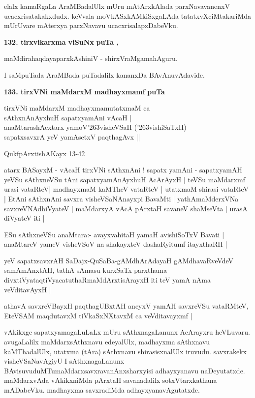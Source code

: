 \smallskip
elalx kamaRgaLa AraMBadalUlx mUru mAtArxkAlada parxNavavanenxV ucacxrisatakakxdudx. keVvala moVkASxkAMkiSxgaLAda tatatxvXciMtakariMda mUrUvare mAterxya parxNavavu ucacxrisalapxDabeVku.

\medskip
\noindent
\textbf{132. tirxvikarxma viSuNx} \hfill{\bf puTa \pageref{81}, \pageref{103a}}

\hfill{maMdirahaqdayaparxkAshiniV - shirxVraMgamahAguru.}

\smallskip
I saMpuTada AraMBada puTadalilx kananxDa BAvAnuvAdavide.

\medskip
\noindent
\textbf{133. tirxVNi maMdarxM madhayxmamf} \hfill{\bf puTa \pageref{154}}

\smallskip
\begin{shloka}
tirxVNi maMdarxM madhayxmamutatxmaM ca\\
sAthxnAnAyxhuH sapatxyamAni vAcaH |\\
anaMtarashAcxtarx yamoV\char'263visheVSaH (\char'263vishiSaTxH)\\
sapatxsavxrA yeV yamAsetxV paqthagAvx ||
\end{shloka}

\hfill{QukfpArxtishAKayx 13-42}

atarx BASayxM - vAcaH tirxVNi sAthxnAni ! sapatx yamAni - sapatxyamAH yeVSu sAthxneVSu tAni sapatxyamAnAyxhuH AcArAyxH | teVSu maMdarxmf urasi vataRteV| madhayxmaM kaMTheV vataRteV | utatxmaM shirasi vataRteV | EtAni sAthxnAni savxra visheVSaNAnayxpi BavaMti | yathAmaMderxVNa savxreVNAdhiVyateV | maMdarxyA vAcA pArxtaH savaneV shaMseVta | urasA diVyateV iti |

ESu sAthxneVSu anaMtara:- avayxvahitaH yamaH avishiSoTxV Bavati | anaMtareV yameV visheVSoV na shakayxteV dashaRyitumf itayxthaRH |

yeV sapatxsavxrAH SaDajx-QuSaBa-gAMdhArAdayaH gAMdhavaRveVdeV samAmAnxtAH, tathA sAmasu kurxSaTx-parxthama-divxtiVyataqtiVyacatuthaRmaMdArxtisArayxH iti teV yamA nAma veVditavAyxH |

athavA savxreVBayxH paqthagUBxtAH aneyxV yamAH savxreVSu vataRMteV, EteVSAM maqdutavxM tiVkaSxNXtavxM ca veVditavayxmf |

vAkikxge sapatxyamagaLuLaLx mUru sAthxnagaLanunx AcArayxru heVLuvaru. avugaLalilx maMdarxsAthxnavu edeyalUlx, madhayxma sAthxnavu kaMThadalUlx, utatxma (tAra) sAthxnavu shirasisxnalUlx iruvudu. savxrakekx visheVSaNavAgiyU I sAthxnagaLanunx BAvisuvuduMTumaMdarxsavxravanAnxsharxyisi adhayxyanavu naDeyutatxde. maMdarxvAda vAkikxniMda pArxtaH savanadalilx sotxVtarxkathana mADabeVku. madhayxma savxradiMda adhayxyanavAgutatxde.

